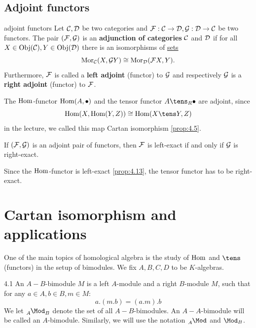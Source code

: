 \documentclass[twoside = false,	%
		headsepline,		%
		parskip = true,
		]{scrbook}						%
\begin{document}
    \subsection{Adjoint functors}
        \begin{definition*}{adjoint functors}
            Let $\mathcal C,\mathcal D$ be two categories and $\mathcal F: \mathcal C \to \mathcal D, \mathcal G: \mathcal D \to \mathcal C$ be two functors. The pair $(\mathcal F,\mathcal G)$ is an \textbf{adjunction of categories} $\mathcal C$ and $\mathcal D$ if for all $X \in \mathrm{Obj}(\mathcal C), Y \in \mathrm{Obj}(\mathcal D)$ there is an isomorphisms of \underline{sets}
            \begin{equation*}
                \mathrm{Mor}_\mathcal C(X,\mathcal G Y) \cong \mathrm{Mor}_\mathcal D(\mathcal F X,Y).
            \end{equation*}
            Furthermore, $\mathcal F$ is called a \textbf{left adjoint} (functor) to $\mathcal G$ and respectively $\mathcal G$ is a \textbf{right adjoint} (functor) to $\mathcal F$.
        \end{definition*}
        The $\mathrm{Hom}$-functor $\mathrm{Hom}(A,\bullet)$ and the tensor functor $A \tens_R \bullet$ are adjoint, since
        \begin{equation*}
            \Hom(X,\Hom(Y,Z)) \cong \Hom(X \tens Y, Z)
        \end{equation*}
        in the lecture, we called this map Cartan isomorphism \ref{prop:4.5}.
        
        \begin{lemma*}{}
            If $(\mathcal F,\mathcal G)$ is an adjoint pair of functors, then $\mathcal F$ is left-exact if and only if $\mathcal G$ is right-exact.
        \end{lemma*}
        
        Since the $\mathrm{Hom}$-functor is left-exact \ref{prop:4.13}, the tensor functor has to be right-exact. 
\section{Cartan isomorphism and applications}

    One of the main topics of homological algebra is the study of $\mathrm{Hom}$ and $\tens$ (functors) in the setup of bimodules. We fix $A,B,C,D$ to be $K$-algebras.

    \begin{definition}{}{4.1}
        An $A-B$-bimodule $M$ is a left $A$-module and a right $B$-module $M$, such that for any $a \in A, b \in B, m \in M$:
        \begin{equation*}
            a.(m.b) = (a.m).b
        \end{equation*}
        We let $\tensor[_A]{\Mod}{_B}$ denote the set of all $A-B$-bimodules. An $A-A$-bimodule will be called an $A$-bimodule. Similarly, we will use the notation $\tensor[_A]{\Mod}{^{}}$ and $\Mod_B$.
    \end{definition}
\end{document}
